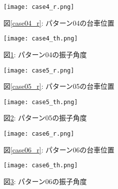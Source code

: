 \begin{figure}[htbp]
    \begin{minipage}{0.5\hsize}
        \begin{center}
            \texttt{[image: case4\_r.png]}
            \caption{図\ref{case04_r}: パターン04の台車位置}
            \label{case04_r}
        \end{center}
    \end{minipage}
    \begin{minipage}{0.5\hsize}
        \begin{center}
            \texttt{[image: case4\_th.png]}
            \caption{図\ref{case04_th}: パターン04の振子角度}
            \label{case04_th}
        \end{center}
    \end{minipage}
\end{figure}

\begin{figure}[htbp]
    \begin{minipage}{0.5\hsize}
        \begin{center}
            \texttt{[image: case5\_r.png]}
            \caption{図\ref{case05_r}: パターン05の台車位置}
            \label{case05_r}
        \end{center}
    \end{minipage}
    \begin{minipage}{0.5\hsize}
        \begin{center}
            \texttt{[image: case5\_th.png]}
            \caption{図\ref{case05_th}: パターン05の振子角度}
            \label{case05_th}
        \end{center}
    \end{minipage}
\end{figure}

\begin{figure}[htbp]
    \begin{minipage}{0.5\hsize}
        \begin{center}
            \texttt{[image: case6\_r.png]}
            \caption{図\ref{case06_r}: パターン06の台車位置}
            \label{case06_r}
        \end{center}
    \end{minipage}
    \begin{minipage}{0.5\hsize}
        \begin{center}
            \texttt{[image: case6\_th.png]}
            \caption{図\ref{case06_th}: パターン06の振子角度}
            \label{case06_th}
        \end{center}
    \end{minipage}
\end{figure}

